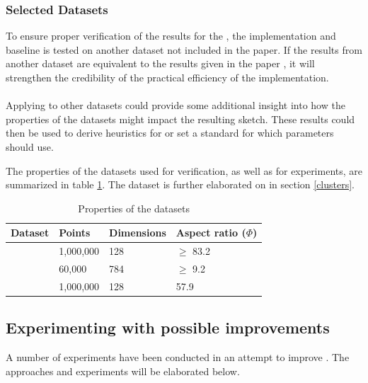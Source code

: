 \subsubsection{Selected Datasets}
\label{datasets}
To ensure proper verification of the results for the \qs{}, the implementation and baseline is tested on another dataset not included in the paper. If the results from another dataset are equivalent to the results given in the paper \cite{wagner17}, it will strengthen the credibility of the practical efficiency of the \qs{} implementation.
\\
\\
Applying \qs{} to other datasets could provide some additional insight into how the properties of the datasets might impact the resulting sketch. These results could then be used to derive heuristics for \qs{} or set a standard for which parameters \qs{} should use.

The properties of the datasets used for verification, as well as for experiments, are summarized in table \ref{tab:datasets}. The \clust{} dataset is further elaborated on in section \ref{clusters}.

\begin{table}[h]
	\centering
	\begin{tabular}{l l l l}
		\hline
		Dataset & Points & Dimensions & Aspect ratio ($\Phi$) \\
		\hline
		\sift{} & 1,000,000 & 128 & $\geq$ 83.2 \\
		\mnist{} & 60,000 & 784 & $\geq$ 9.2 \\
		\clust{} & 1,000,000 & 128 & 57.9 \\
		\hline
	\end{tabular}
	\caption{Properties of the datasets}
	\label{tab:datasets}
\end{table}

\subsection{Experimenting with possible improvements}
\label{possible_improvements}
A number of experiments have been conducted in an attempt to improve \qs{}. The approaches and experiments will be elaborated below.
